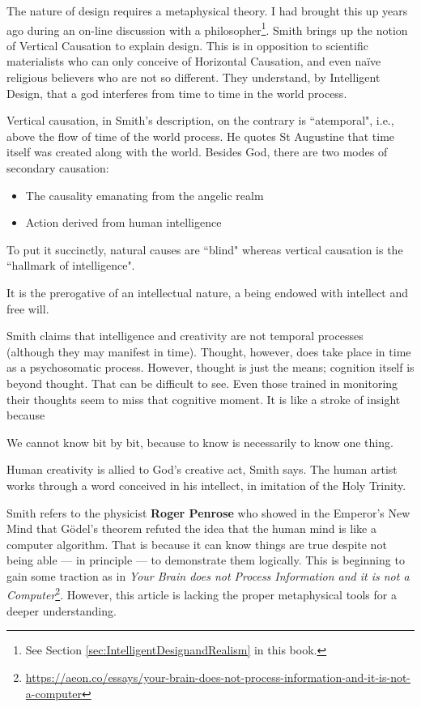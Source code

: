 The nature of design requires a metaphysical theory. I had brought this up years ago during an on-line discussion with a philosopher\footnote{See Section \ref{sec:IntelligentDesignandRealism} in this book.}. Smith brings up the notion of Vertical Causation to explain design. This is in opposition to scientific materialists who can only conceive of Horizontal Causation, and even naïve religious believers who are not so different. They understand, by Intelligent Design, that a god interferes from time to time in the world process.

Vertical causation, in Smith's description, on the contrary is ``atemporal", i.e., above the flow of time of the world process. He quotes St Augustine that time itself was created along with the world. Besides God, there are two modes of secondary causation:

\begin{itemize}
\item The causality emanating from the angelic realm 
\item Action derived from human intelligence 
\end{itemize}
To put it succinctly, natural causes are ``blind" whereas vertical causation is the ``hallmark of intelligence".

\begin{quotex}
It is the prerogative of an intellectual nature, a being endowed with intellect and free will. 

\end{quotex}
Smith claims that intelligence and creativity are not temporal processes (although they may manifest in time). Thought, however, does take place in time as a psychosomatic process. However, thought is just the means; cognition itself is beyond thought. That can be difficult to see. Even those trained in monitoring their thoughts seem to miss that cognitive moment. It is like a stroke of insight because

\begin{quotex}
We cannot know bit by bit, because to know is necessarily to know one thing. 

\end{quotex}
Human creativity is allied to God's creative act, Smith says. The human artist works through a word conceived in his intellect, in imitation of the Holy Trinity.

Smith refers to the physicist \textbf{Roger Penrose} who showed in the Emperor's New Mind that Gödel's theorem refuted the idea that the human mind is like a computer algorithm. That is because it can know things are true despite not being able — in principle — to demonstrate them logically. This is beginning to gain some traction as in \textit{Your Brain does not Process Information and it is not a Computer}\footnote{\url{https://aeon.co/essays/your-brain-does-not-process-information-and-it-is-not-a-computer}}. However, this article is lacking the proper metaphysical tools for a deeper understanding.

